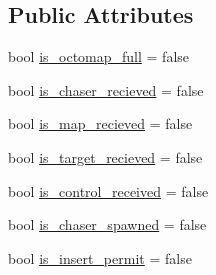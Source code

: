 \subsection*{Public Attributes}
\begin{DoxyCompactItemize}
\item 
bool \hyperlink{class_objects_handler_a56f70ac04c01e8b948a4b44fa5670f49}{is\+\_\+octomap\+\_\+full} = false
\item 
bool \hyperlink{class_objects_handler_a86f8528ff5697c87fc6a3fcd6ba0f42c}{is\+\_\+chaser\+\_\+recieved} = false
\item 
bool \hyperlink{class_objects_handler_acf1ef1b318defc2a39d87cea72689478}{is\+\_\+map\+\_\+recieved} = false
\item 
bool \hyperlink{class_objects_handler_a7691f3e1ec58e55ead30c50c555f169a}{is\+\_\+target\+\_\+recieved} = false
\item 
bool \hyperlink{class_objects_handler_a88fb913340c535df81f3b7ae5f06df61}{is\+\_\+control\+\_\+received} = false
\item 
bool \hyperlink{class_objects_handler_a16165ae7c0167ba8d2a0151a8a4fbfd5}{is\+\_\+chaser\+\_\+spawned} = false
\item 
bool \hyperlink{class_objects_handler_acaefe98eb412d4c32cda2bf0bd602ae7}{is\+\_\+insert\+\_\+permit} = false
\end{DoxyCompactItemize}
